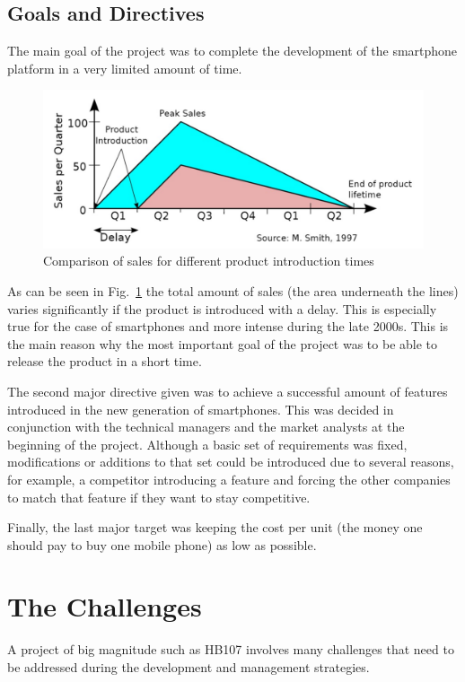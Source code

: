 \documentclass[conference]{IEEEtran}
\begin{document}
\subsection{Goals and Directives}
The main goal of the project was to complete the development of the smartphone platform in a very limited amount of time. 

\begin{figure}[h]
    \centering
    \includegraphics[width=\linewidth]{sales.jpg}
    \caption{Comparison of sales for different product introduction times}
    \label{fig:sales}
\end{figure}

As can be seen in Fig.~\ref{fig:sales} the total amount of sales (the area underneath the lines) varies significantly if the product is introduced with a delay. This is especially true for the case of smartphones and more intense during the late 2000s. This is the main reason why the most important goal of the project was to be able to release the product in a short time.

The second major directive given was to achieve a successful amount of features introduced in the new generation of smartphones. This was decided in conjunction with the technical managers and the market analysts at the beginning of the project. Although a basic set of requirements was fixed, modifications or additions to that set could be introduced due to several reasons, for example, a competitor introducing a feature and forcing the other companies to match that feature if they want to stay competitive.

Finally, the last major target was keeping the cost per unit (the money one should pay to buy one mobile phone) as low as possible. 

\section{The Challenges}
A project of big magnitude such as HB107 involves many challenges that need to be addressed during the development and management strategies.
\end{document}
